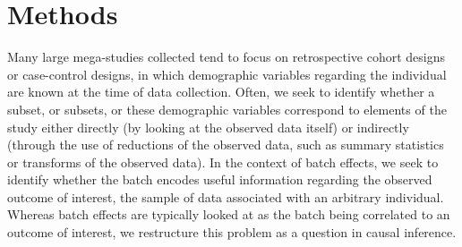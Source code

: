 %

\section{Methods}

Many large mega-studies collected tend to focus on retrospective cohort designs or case-control designs, in which demographic variables regarding the individual are known at the time of data collection. Often, we seek to identify whether a subset, or subsets, or these demographic variables correspond to elements of the study either directly (by looking at the observed data itself) or indirectly (through the use of reductions of the observed data, such as summary statistics or transforms of the observed data). In the context of batch effects, we seek to identify whether the batch encodes useful information regarding the observed outcome of interest, the sample of data associated with an arbitrary individual. Whereas batch effects are typically looked at as the batch being correlated to an outcome of interest, we restructure this problem as a question in causal inference.  


